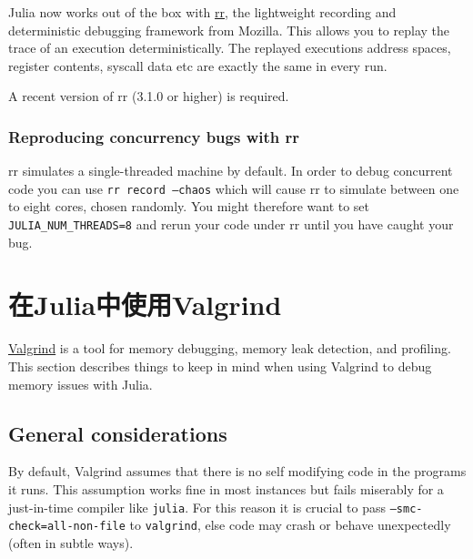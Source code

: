 Julia now works out of the box with \href{http://rr-project.org/}{rr}, the lightweight recording and deterministic debugging framework from Mozilla. This allows you to replay the trace of an execution deterministically.  The replayed execution{\textquotesingle}s address spaces, register contents, syscall data etc are exactly the same in every run.



A recent version of rr (3.1.0 or higher) is required.



\hypertarget{8199500901675456324}{}


\subsubsection{Reproducing concurrency bugs with rr}



rr simulates a single-threaded machine by default. In order to debug concurrent code you can use \texttt{rr record --chaos} which will cause rr to simulate between one to eight cores, chosen randomly. You might therefore want to set \texttt{JULIA\_NUM\_THREADS=8} and rerun your code under rr until you have caught your bug.



\hypertarget{1705795605392310931}{}


\section{在Julia中使用Valgrind}



\href{http://valgrind.org/}{Valgrind} is a tool for memory debugging, memory leak detection, and profiling.  This section describes things to keep in mind when using Valgrind to debug memory issues with Julia.



\hypertarget{527857279218691176}{}


\subsection{General considerations}



By default, Valgrind assumes that there is no self modifying code in the programs it runs.  This assumption works fine in most instances but fails miserably for a just-in-time compiler like \texttt{julia}.  For this reason it is crucial to pass \texttt{--smc-check=all-non-file} to \texttt{valgrind}, else code may crash or behave unexpectedly (often in subtle ways).



